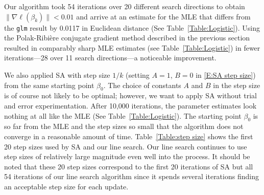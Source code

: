 Our algorithm took 54 iterations over 20 different search directions to obtain $\lVert 
\nabla \ell( \beta_k ) \rVert < 
0.01$ and arrive at an estimate for the MLE that differs from the \texttt{glm} result 
by 0.0117 in Euclidean distance 
(See Table~\ref{Table:Logistic}).  
Using the Polak-Ribi\`{e}re conjugate gradient method described in the previous 
section  resulted in comparably sharp 
MLE estimates (see Table~\ref{Table:Logistic}) in fewer iterations---28 over 11 search 
directions---a noticeable 
improvement. 

We also applied  SA with step size $1/k$ (setting $A=1$, $B=0$ in \eqref{E:SA step 
size}) from the same starting point 
$\beta_0$.  The choice of constants $A$ and $B$ in the step size is of course not 
likely to be optimal;
however, we want to apply SA without trial and error experimentation.  
After 10,000 iterations, the parameter estimates look nothing at all like the MLE (See 
Table~\ref{Table:Logistic}).  
The starting point $\beta_0$ is so far from the MLE and the step sizes so small that 
the algorithm does not converge in a reasonable amount of time.
Table~\ref{Table:step size} shows the first 20 step sizes used by SA and our line 
search. Our line search continues to 
use step sizes of relatively large magnitude even well into the process.  It should be 
noted that these 20 step sizes 
correspond to the first 20 iterations of SA but all 54 iterations of our line search 
algorithm since it spends several 
iterations finding an acceptable step size for each update.


